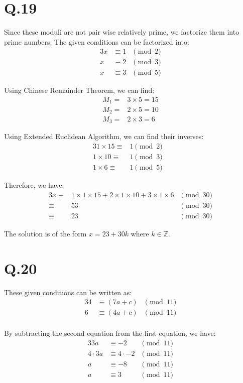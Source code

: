 \documentclass[a4paper,12pt]{article}
\begin{document}
\section*{Q.19}

Since these moduli are not pair wise relatively prime, we factorize them into prime numbers.
The given conditions can be factorized into:
\begin{alignat*}{3}
	x &\equiv 1 &\pmod{2} \\
	x &\equiv 2 &\pmod{3} \\
	x &\equiv 3 &\pmod{5} 
\end{alignat*}

Using Chinese Remainder Theorem, we can find:
\begin{align*}
	M_1 =& 3 \times 5 = 15 \\
	M_2 =& 2 \times 5 = 10 \\
	M_3 =& 2 \times 3 = 6
\end{align*}

Using Extended Euclidean Algorithm, we can find their inverses:
\begin{alignat*}{3}
	1 \times 15 \equiv& 1 \pmod{2}& \\
	1 \times 10 \equiv& 1 \pmod{3}& \\
	1 \times 6 \equiv& 1 \pmod{5}&
\end{alignat*}

Therefore, we have:
\begin{alignat*}{3}
	x \equiv& 1 \times 1 \times 15 + 2 \times 1 \times 10 + 3 \times 1 \times 6 &\pmod{30} \\
	\equiv& 53 &\pmod{30} \\
	\equiv& 23 &\pmod{30}
\end{alignat*}

The solution is of the form $x = 23 + 30k$ where $k \in \mathbb{Z}$.

\section*{Q.20}

These given conditions can be written as:
\begin{alignat*}{3}
	4 &\equiv (7a+c) &\pmod{11} \\
	6 &\equiv (4a+c) &\pmod{11} \\
\end{alignat*}

By subtracting the second equation from the first equation, we have:
\begin{alignat*}{3}
	3a &\equiv -2 &\pmod{11} \\
	4 \cdot 3a &\equiv 4 \cdot -2 &\pmod{11} \\
	a &\equiv -8 &\pmod{11} \\
	a &\equiv 3 &\pmod{11}
\end{alignat*}
\end{document}
